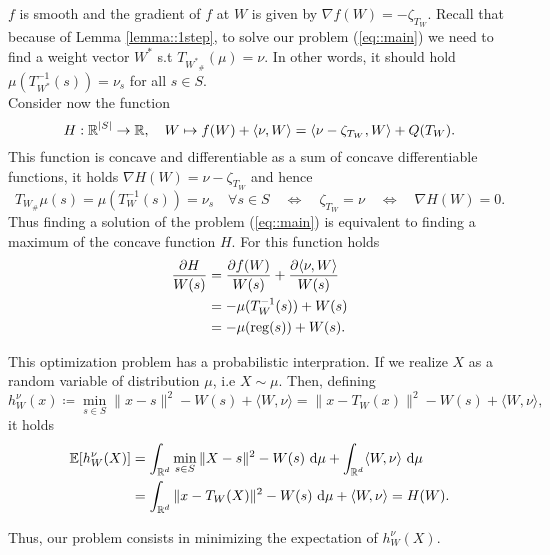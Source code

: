 \documentclass[
     12pt,         %
     a4paper,      %
     BCOR=10mm,     %
     DIV=14,        %
     ]{scrreprt}
\begin{document}
    $f$ is smooth and the gradient of $f$ at $W$ is given by $\nabla f(W) = - \zeta_{T_{W}}$.
    Recall that because of Lemma \ref{lemma::1step}, to solve our problem (\ref{eq::main}) we need to find a weight vector $W^*$ s.t $T_{{W^*}_{\#}}(\mu) = \nu$. 
    In other words, it should hold $\mu(T_{W^*}^{-1} (s)) = \nu_s $ for all $s\in S$. \\
    Consider now the function
    \[H: \operatorname{\mathbb{R}}^{|S|} \to \operatorname{\mathbb{R}}, \quad W \mapsto f(W) + \langle \nu, W \rangle = \langle \nu - \zeta_{T_{W}}, W \rangle + Q(T_W). \]
    This function is concave and differentiable as a sum of concave differentiable functions, it holds $\nabla H(W) = \nu - \zeta_{T_{W}}$ and hence
    \[ T_{W_{\#}}\mu(s) =\mu(T_W^{-1}(s)) = \nu_s \quad \forall s\in S \quad  \Leftrightarrow \quad  \zeta_{T_{W}} = \nu \quad  \Leftrightarrow \quad \nabla H(W) = 0. \]
    Thus finding a solution of the problem (\ref{eq::main}) is equivalent to finding a maximum of the concave function $H$. For this function holds
    \begin{align*}
        \frac{\partial H}{W(s)}  &=  \frac{\partial f(W)}{W(s)}  + \frac{\partial \langle \nu, W \rangle}{W(s)} \\
                                &= -\mu(T_W^{-1}(s)) + W(s) \\
                                &= -\mu(\operatorname{reg}(s)) + W(s).
    \end{align*}
    
    This optimization problem has a probabilistic interpration. If we realize $X$ as a random variable of distribution $\mu$, i.e $X \sim \mu$. Then, defining
    \[h_W^\nu(x) \coloneqq \min_{s\in S} \|x-s\|^2 - W(s) + \langle W, \nu  \rangle = \|x-T_W(x)\|^2 -W(s) + \langle W, \nu  \rangle, \]
    it holds 
    \begin{align*}
        \operatorname{\mathbb{E}}[h_W^\nu(X)] &= \int_{\operatorname{\mathbb{R}}^d} \min_{s\in S} \|X-s\|^2 - W(s) \ {\operatorname{{\mathrm{d}}}} \mu + \int_{\operatorname{\mathbb{R}}^d} \langle W, \nu  \rangle  \ {\operatorname{{\mathrm{d}}}} \mu \\
                    &= \int_{\operatorname{\mathbb{R}}^d} \|x-T_W(X)\|^2 -W(s) \ {\operatorname{{\mathrm{d}}}} \mu + \langle W, \nu  \rangle  = H(W).
    \end{align*}

    Thus, our problem consists in minimizing the expectation of $h_W^\nu(X)$.
     
    
\end{document}
